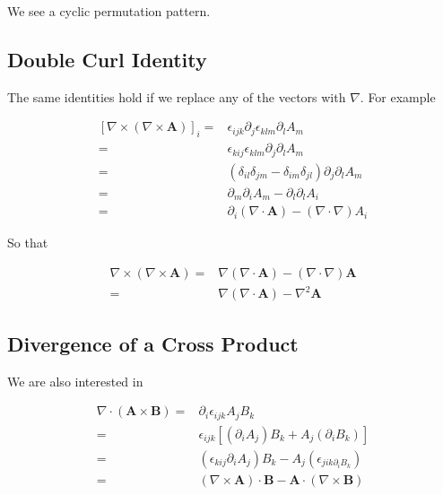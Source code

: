 \documentclass[12pt]{article}
\newcommand{\ep}{\epsilon}
\renewcommand{\vec}[1]{\boldsymbol{#1}}
\begin{document}
We see a cyclic permutation pattern.

\subsection{Double Curl Identity}
The same identities hold if we replace any of the vectors with $\nabla$.
For example

\begin{align}
\left[\nabla\times(\nabla\times\vec{A})\right]_i =& \ep_{ijk}\partial_j\ep_{klm}\partial_lA_m\\
=&\ep_{kij}\ep_{klm} \partial_j\partial_lA_m\\
=& (\delta_{il}\delta_{jm} - \delta_{im}\delta_{jl}) \partial_j\partial_lA_m\\
=& \partial_m \partial_i A_m - \partial_l \partial_l A_i\\
=& \partial_i (\nabla\cdot\vec{A}) - (\nabla\cdot\nabla)A_i
\end{align}

So that

\begin{align}
\nabla \times(\nabla \times \vec{A}) =& \nabla (\nabla \cdot \vec{A}) - (\nabla\cdot\nabla)\vec{A}\\
=&\nabla (\nabla \cdot \vec{A}) - \nabla^2 \vec{A}
\end{align}

\subsection{Divergence of a Cross Product}
We are also interested in

\begin{align}
\nabla \cdot (\vec{A}\times \vec{B}) =& \partial_i \ep_{ijk} A_jB_k\\
=& \ep_{ijk} \left[(\partial_iA_j)B_k + A_j (\partial_i B_k)\right]\\
=& (\ep_{kij} \partial_iA_j)B_k - A_j(\ep_{jik\partial_i B_k})\\
=& (\nabla\times \vec{A})\cdot\vec{B} - \vec{A}\cdot(\nabla \times \vec{B})
\end{align}
\end{document}
